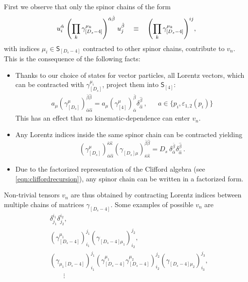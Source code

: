 First we observe that only the spinor chains of the form
\begin{equation} \label{eq:generic_dsm_4_schain}
  u^{\hat{\alpha}}_i \; \qty( \prod_k \gamma^{\mu_k}_{[D_s -4 ]} )^{\hat{\alpha}\hat{\beta}} \; u^{\hat{\beta}}_j \quad\equiv\quad 
  \qty( \prod_k \gamma^{\mu_k}_{[D_s -4 ]} )^{i j},
\end{equation}
with indices $\mu_i \in \mathsf{S}_{[D_s -4]}$ contracted to other spinor chains, contribute to $v_n$.
This is the consequence of the following facts:
\begin{itemize}
  \item Thanks to our choice of states for vector particles, all Lorentz vectors, which can be contracted with $\gamma^{\mu_i}_{[D_s]}$,
    project them into $\mathsf{S}_{[4]}$:
    \begin{align} \label{eq:trivialTens1}
      a_{\mu}
      \left( \gamma_{[D_s]}^\mu \right)_{\bar{\alpha}\hat{\alpha}}^{\bar{\beta}\hat{\beta}} =
      a_{\mu}\left(\gamma_{[4]}^\mu \right)_{\bar{\alpha}}^{\bar{\beta}} \delta_{\hat{\alpha}}^{\hat{\beta}}\,,
      &&
      a \in \{p_i,\varepsilon_{1,2}(p_i)\}
    \end{align}
    This has an effect that no kinematic-dependence can enter $v_n$.
  \item Any Lorentz indices inside the same spinor chain can be contracted yielding  
    \begin{equation} \label{eq:trivialTens2}
      \left(\gamma_{[D_s]}^\mu\right)_{\bar{\alpha}\hat{\alpha}}^{\bar{\kappa}\hat{\kappa}}
      \left(\gamma_{[D_s]\mu}^{\phantom{\mu}}\right)_{\bar{\kappa}\hat{\kappa}}^{\bar{\beta}\hat{\beta}}
      =D_s~\delta_{\bar{\alpha}}^{\bar{\beta}}\delta_{\hat{\alpha}}^{\hat{\beta}}\,.
    \end{equation} 
  \item Due to the factorized representation of the Clifford algebra (see \cref{eqn:cliffordrecursion}), any spinor chain can be written in a factorized form.
\end{itemize}
Non-trivial tensors $v_n$ are thus obtained by contracting
Lorentz indices between multiple chains of  matrices $\gamma_{[D_s-4]}$.
Some examples of possible $v_n$ are
\begin{equation}
  \begin{aligned}
    & \delta^{i_1}_{j_1} \delta^{i_2}_{j_2},\\
    & (\gamma_{[D_s-4]}^{\mu_1} )_{i_1}^{j_1} (\gamma_{[D_s-4]\mu_1}^{\phantom{\mu}})_{i_2}^{j_2}, \\
    & (\gamma_{\mu_1[D_s-4]}^{\phantom{\mu}} )_{i_1}^{j_1} (\gamma_{[D_s-4]}^{\mu_1}\gamma_{[D_s-4]}^{\mu_2} )_{i_2}^{j_2} (\gamma_{[D_s-4]\mu_2}^{\phantom{\mu}})_{i_3}^{j_3},\\
    & \qquad \vdots{}
  \end{aligned}
\end{equation}


